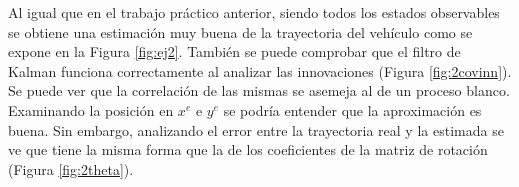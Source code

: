 
	Al igual que en el trabajo práctico anterior, siendo todos los estados observables se obtiene una estimación muy buena de la trayectoria del vehículo como se expone en la Figura \ref{fig:ej2}. También se puede comprobar que el filtro de Kalman funciona correctamente al analizar las innovaciones (Figura \ref{fig:2covinn}). Se puede ver que la correlación de las mismas se asemeja al de un proceso blanco.
	Examinando la posición en $x^e$ e $y^e$ se podría entender que la aproximación es buena. Sin embargo, analizando el error entre la trayectoria real y la estimada se ve que tiene la misma forma que la de los coeficientes de la matriz de rotación (Figura \ref{fig:2theta}). 

